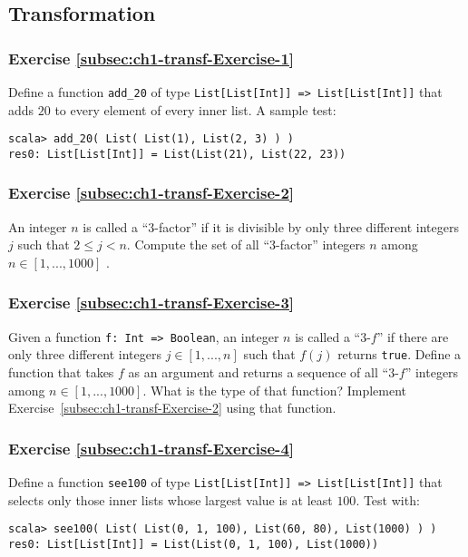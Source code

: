 \subsection{Transformation}

\subsubsection{Exercise \label{subsec:ch1-transf-Exercise-1}\ref{subsec:ch1-transf-Exercise-1}}

Define a function \texttt{}\lstinline!add_20! of type \texttt{}\lstinline!List[List[Int]] => List[List[Int]]!
that adds $20$ to every element of every inner list. A sample test:
\begin{lstlisting}
scala> add_20( List( List(1), List(2, 3) ) )
res0: List[List[Int]] = List(List(21), List(22, 23))
\end{lstlisting}


\subsubsection{Exercise \label{subsec:ch1-transf-Exercise-2}\ref{subsec:ch1-transf-Exercise-2}}

An integer $n$ is called a ``$3$-factor'' if it is divisible by
only three different integers $j$ such that $2\leq j<n$. Compute
the set of all ``$3$-factor'' integers $n$ among $n\in[1,...,1000]$
.

\subsubsection{Exercise \label{subsec:ch1-transf-Exercise-3}\ref{subsec:ch1-transf-Exercise-3}}

Given a function \lstinline!f: Int => Boolean!, an integer $n$ is
called a ``$3$-$f$'' if there are only three different integers
$j\in[1,...,n]$ such that $f(j)$ returns \lstinline!true!. Define
a function that takes $f$ as an argument and returns a sequence of
all ``$3$-$f$'' integers among $n\in[1,...,1000]$. What is the
type of that function? Implement Exercise~\ref{subsec:ch1-transf-Exercise-2}
using that function.

\subsubsection{Exercise \label{subsec:ch1-transf-Exercise-4}\ref{subsec:ch1-transf-Exercise-4}}

Define a function \lstinline!see100! of type \texttt{}\lstinline!List[List[Int]] => List[List[Int]]!
that selects only those inner lists whose largest value is at least
$100$. Test with:
\begin{lstlisting}
scala> see100( List( List(0, 1, 100), List(60, 80), List(1000) ) )
res0: List[List[Int]] = List(List(0, 1, 100), List(1000))
\end{lstlisting}


